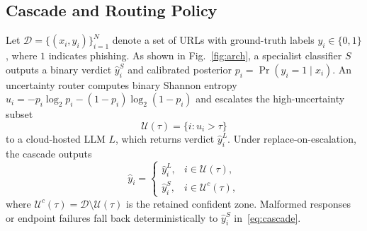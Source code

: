 \documentclass[conference,a4paper]{IEEEtran}
\begin{document}
\subsection{Cascade and Routing Policy}
Let $\mathcal{D}=\{(x_i,y_i)\}_{i=1}^{N}$ denote a set of URLs with ground-truth
labels $y_i\in\{0,1\}$, where $1$ indicates phishing. As shown in Fig.~\ref{fig:arch},
a specialist classifier $S$ outputs a binary verdict $\hat{y}^S_i$ and calibrated
posterior $p_i = \Pr(y_i=1 \mid x_i)$. An uncertainty router computes binary Shannon
entropy $u_i = -p_i \log_2 p_i - (1-p_i) \log_2 (1-p_i)$ and escalates the
high-uncertainty subset
\begin{equation}
\mathcal{U}(\tau) = \{i : u_i > \tau\}
\label{eq:topzone}
\end{equation}
to a cloud-hosted LLM $L$, which returns verdict $\hat{y}^L_i$. Under
replace-on-escalation, the cascade outputs
\begin{equation}
\hat{y}_i =
\begin{cases}
\hat{y}^L_i, & i \in \mathcal{U}(\tau),\\[2pt]
\hat{y}^S_i, & i \in \mathcal{U}^c(\tau),
\end{cases}
\label{eq:cascade}
\end{equation}
where $\mathcal{U}^c(\tau)=\mathcal{D}\setminus\mathcal{U}(\tau)$ is the retained
confident zone. Malformed responses or endpoint failures fall back deterministically
to $\hat{y}^S_i$ in~\eqref{eq:cascade}.
\end{document}
